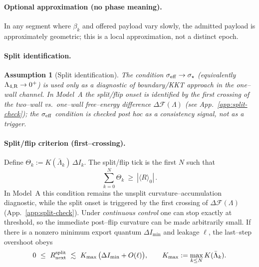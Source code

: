 \documentclass[10pt]{article}
\theoremstyle{definition}
\theoremstyle{plain}
\newtheorem{assumption}{Assumption}[section]
\begin{document}
\paragraph{Optional approximation (no phase meaning).}\label{par:uom-main-141}
In any segment where $\beta_k$ and offered payload vary slowly, the admitted payload is approximately
geometric; this is a local approximation, not a distinct epoch.

\paragraph{Split identification.}\label{par:uom-main-142}
\begin{assumption}[Split identification]\label{ass:split-ident}
The condition $\sigma_{\rm eff}\to\sigma_\star$ (equivalently $\Lambda_{4,{\rm R}}\to0^+$) is used only as a
\emph{diagnostic} of boundary/KKT approach in the one--wall channel. In Model~A the split/flip onset is
identified by the first crossing of the two--wall vs.\ one--wall free--energy difference
$\Delta\mathcal F(\Lambda)$ (see App.~\ref{app:split-check}); the $\sigma_{\rm eff}$ condition is checked
post hoc as a consistency signal, not as a trigger.
\end{assumption}

\paragraph{Split/flip criterion (first--crossing).}\label{par:uom-main-143}
Define $\Theta_k:=K(\bar\Lambda_k)\,\Delta I_k$. The split/flip tick is the first $N$ such that
\begin{equation}
\label{eq:flip-condition-updated}
\sum_{k=0}^{N}\Theta_k\ \ge\ |\langle R\rangle_0|\,.
\end{equation}
In Model~A this condition remains the unsplit curvature--accumulation diagnostic, while the split onset
is triggered by the first crossing of $\Delta\mathcal F(\Lambda)$ (App.~\ref{app:split-check}).
Under \emph{continuous control} one can stop exactly at threshold, so the immediate post--flip curvature
can be made arbitrarily small. If there is a nonzero minimum export quantum $\Delta I_{\min}$ and leakage
$\ell$, the last--step overshoot obeys
\[
0\ \le\ R_{\rm next}^{\rm split}\ \lesssim\ K_{\max}\,\big(\Delta I_{\min}+O(\ell)\big),
\qquad K_{\max}:=\max_{k\le N} K(\bar\Lambda_k).
\]
\end{document}
